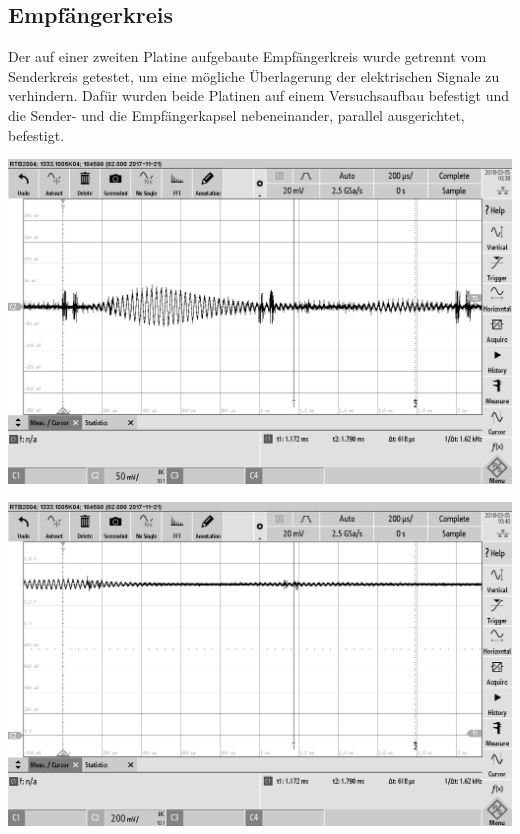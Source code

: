 \subsection{Empfängerkreis}
Der auf einer zweiten Platine aufgebaute Empfängerkreis wurde getrennt vom Senderkreis getestet, um eine mögliche Überlagerung der elektrischen Signale zu verhindern. Dafür wurden beide Platinen auf einem Versuchsaufbau befestigt und die Sender- und die Empfängerkapsel nebeneinander, parallel ausgerichtet, befestigt.\\
\begin{minipage}{0.5\textwidth}
\includegraphics[width=1\textwidth%
]{Abbildungen/MessungenP1/Signal-Empfang.png}
\label{fig:Empfang am LS}
\end{minipage}
\begin{minipage}{0.5\textwidth}
\includegraphics[width=1\textwidth%
]{Abbildungen/MessungenP1/Signal-nach-der-Filterung.png}
\label{fig:Filterung}
\end{minipage}

